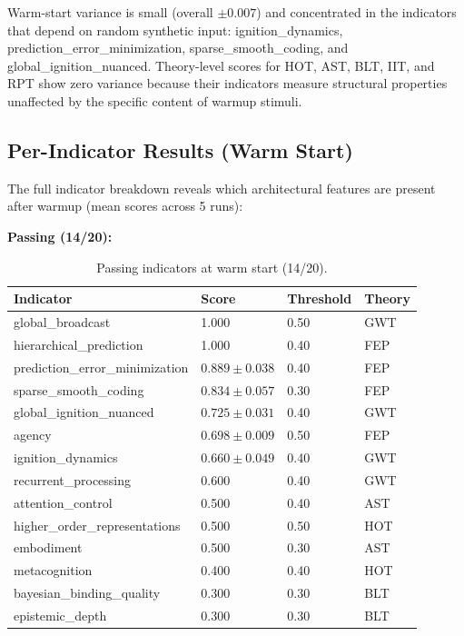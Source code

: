 Warm-start variance is small (overall $\pm 0.007$) and concentrated in the indicators that depend on random synthetic input: ignition\_dynamics, prediction\_error\_minimization, sparse\_smooth\_coding, and global\_ignition\_nuanced. Theory-level scores for HOT, AST, BLT, IIT, and RPT show zero variance because their indicators measure structural properties unaffected by the specific content of warmup stimuli.

\subsection{Per-Indicator Results (Warm Start)}
\label{sec:per-indicator}

The full indicator breakdown reveals which architectural features are present after warmup (mean scores across 5 runs):

\textbf{Passing (14/20):}

\begin{table}[t]
\centering
\begin{tabular}{llll}
\toprule
Indicator & Score & Threshold & Theory \\
\midrule
global\_broadcast & 1.000 & 0.50 & GWT \\
hierarchical\_prediction & 1.000 & 0.40 & FEP \\
prediction\_error\_minimization & $0.889 \pm 0.038$ & 0.40 & FEP \\
sparse\_smooth\_coding & $0.834 \pm 0.057$ & 0.30 & FEP \\
global\_ignition\_nuanced & $0.725 \pm 0.031$ & 0.40 & GWT \\
agency & $0.698 \pm 0.009$ & 0.50 & FEP \\
ignition\_dynamics & $0.660 \pm 0.049$ & 0.40 & GWT \\
recurrent\_processing & 0.600 & 0.40 & GWT \\
attention\_control & 0.500 & 0.40 & AST \\
higher\_order\_representations & 0.500 & 0.50 & HOT \\
embodiment & 0.500 & 0.30 & AST \\
metacognition & 0.400 & 0.40 & HOT \\
bayesian\_binding\_quality & 0.300 & 0.30 & BLT \\
epistemic\_depth & 0.300 & 0.30 & BLT \\
\bottomrule
\end{tabular}
\caption{Passing indicators at warm start (14/20).}
\label{tab:passing-indicators}
\end{table}

